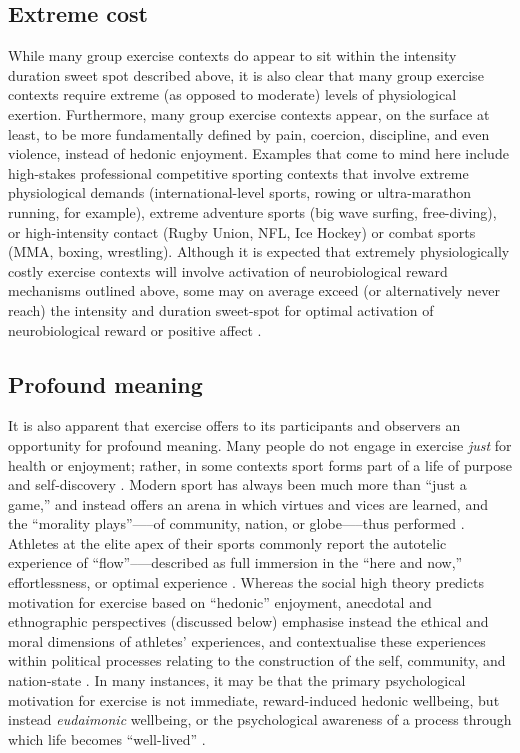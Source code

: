 \begin{CJK}{UTF8}{gbsn}
\subsection{Extreme cost}
While many group exercise contexts do appear to sit within the intensity duration sweet spot described above, it is also clear that many group exercise contexts require extreme (as opposed to moderate) levels of physiological exertion.  Furthermore, many group exercise contexts appear, on the surface at least, to be more fundamentally defined by pain, coercion, discipline, and even violence, instead of hedonic enjoyment.  Examples that come to mind here include high-stakes professional competitive sporting contexts that involve extreme physiological demands (international-level sports, rowing or ultra-marathon running, for example), extreme adventure sports (big wave surfing, free-diving), or high-intensity contact (Rugby Union, NFL, Ice Hockey) or combat  sports (MMA, boxing, wrestling).  Although it is expected that extremely physiologically costly exercise contexts will involve activation of neurobiological reward mechanisms outlined above, some may on average exceed (or alternatively never reach) the intensity and duration sweet-spot for optimal activation of neurobiological reward \citep{Raichlen2013} or positive affect \citep{Ekkekakis2011,Reed2006}.


\subsection{Profound meaning}
It is also apparent that exercise offers to its participants and observers an opportunity for profound meaning.  Many people do not engage in exercise \textit{just} for health or enjoyment; rather, in some contexts sport forms part of a life of purpose and self-discovery \citep[see, for example][]{Jackson1995,Jones2004,White2011}.  Modern sport has always been much more than ``just a game,'' and instead offers an arena in which virtues and vices are learned, and the ``morality plays''—--of community, nation, or globe—--thus performed \citep{Elias1986,McNamee2008}.  Athletes at the elite apex of their sports commonly report the autotelic experience of ``flow''--—described as full immersion in the ``here and now,'' effortlessness, or optimal experience \citep{Csikszentmihalyi1992,Dietrich2004}.  Whereas the social high theory predicts motivation for exercise based on ``hedonic'' enjoyment, anecdotal and ethnographic perspectives (discussed below) emphasise instead the ethical and moral dimensions of athletes’ experiences, and contextualise these experiences within political processes relating to the construction of the self, community, and nation-state \citep{Alter1993,Brownell1995, Downey2005b,Wacquant2004}.  In many instances, it may be that the primary psychological motivation for exercise is not immediate, reward-induced hedonic wellbeing, but instead \textit{eudaimonic} wellbeing, or the psychological awareness of a process through which life becomes ``well-lived'' \citep{Fave2009,Huta2013}.


\end{CJK}

